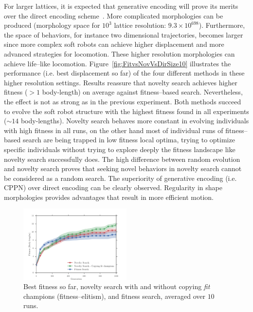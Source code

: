\documentclass{sig-alternate}
\begin{document}
For larger lattices, it is expected that generative encoding will prove its merits over the direct encoding scheme~\cite{cheney2013unshackling,stanley2007compositional}. More complicated morphologies can be produced (morphology space for $10^3$ lattice resolution: $9.3 \times 10^{698}$). Furthermore, the space of behaviors, for instance two dimensional trajectories, becomes larger since more complex soft robots can achieve higher displacement and more advanced strategies for locomotion. These higher resolution morphologies can achieve life--like locomotion. Figure~\ref{fig:FitvsNovVsDirSize10} illustrates the performance (i.e. best displacement so far) of the four different methods in these higher resolution settings. Results reassure that novelty search achieves higher fitness ($> 1$ body-length) on average against fitness--based search. Nevertheless, the effect is not as strong as in the previous experiment. Both methods succeed to evolve the soft robot structure with the highest fitness found in all experiments ($\sim 14$ body-lengths). Novelty search behaves more constant in evolving individuals with high fitness in all runs, on the other hand most of individual runs of fitness--based search are being trapped in low fitness local optima, trying to optimize specific individuals without trying to explore deeply the fitness landscape like novelty search successfully does. The high difference between random evolution and novelty search proves that seeking novel behaviors in novelty search cannot be considered as a random search. The superiority of generative encoding (i.e. CPPN) over direct encoding can be clearly observed. Regularity in shape morphologies provides advantages that result in more efficient motion.

\begin{figure}[t!]
\centering
\includegraphics[width=0.5\textwidth]{../Figures/Results/CopyFitChampions10.pdf}
\caption{Best fitness so far, novelty search with and without copying \emph{fit} champions (fitness--elitism), and fitness search, averaged over $10$ runs.}
\label{fig:CopyFitChampions10}
\end{figure}
\end{document}
